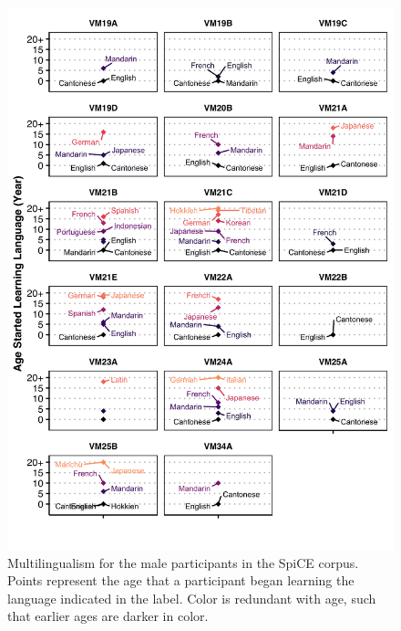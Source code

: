 \begin{figure}[!htbp]
  \begin{center}
  \includegraphics[width=4.5in]{figures/ch2_multilingualism_vm_5in.png} 
  \caption{Multilingualism for the male participants in the SpiCE corpus. Points represent the age that a participant began learning the language indicated in the label. Color is redundant with age, such that earlier ages are darker in color.}
  \label{ch2:fig:multilingualism_vm}
  \end{center}
\end{figure}


